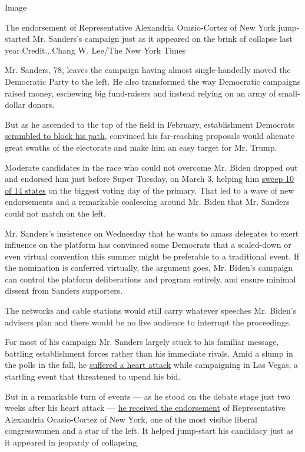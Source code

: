 Image

The endorsement of Representative Alexandria Ocasio-Cortez of New York
jump-started Mr. Sanders's campaign just as it appeared on the brink of
collapse last year.Credit...Chang W. Lee/The New York Times

Mr. Sanders, 78, leaves the campaign having almost single-handedly moved
the Democratic Party to the left. He also transformed the way Democratic
campaigns raised money, eschewing big fund-raisers and instead relying
on an army of small-dollar donors.

But as he ascended to the top of the field in February, establishment
Democrats
\href{https://www.nytimes.com/2020/03/02/us/politics/bernie-sanders-democratic-party.html?searchResultPosition=1}{scrambled
to block his path}, convinced his far-reaching proposals would alienate
great swaths of the electorate and make him an easy target for Mr.
Trump.

Moderate candidates in the race who could not overcome Mr. Biden dropped
out and endorsed him just before Super Tuesday, on March 3, helping him
\href{https://www.nytimes.com/2020/03/03/us/politics/super-tuesday-primary-winners.html}{sweep
10 of 14 states} on the biggest voting day of the primary. That led to a
wave of new endorsements and a remarkable coalescing around Mr. Biden
that Mr. Sanders could not match on the left.

Mr. Sanders's insistence on Wednesday that he wants to amass delegates
to exert influence on the platform has convinced some Democrats that a
scaled-down or even virtual convention this summer might be preferable
to a traditional event. If the nomination is conferred virtually, the
argument goes, Mr. Biden's campaign can control the platform
deliberations and program entirely, and ensure minimal dissent from
Sanders supporters.

The networks and cable stations would still carry whatever speeches Mr.
Biden's advisers plan and there would be no live audience to interrupt
the proceedings.

For most of his campaign Mr. Sanders largely stuck to his familiar
message, battling establishment forces rather than his immediate rivals.
Amid a slump in the polls in the fall, he
\href{https://www.nytimes.com/2019/10/04/us/politics/bernie-sanders-hospital.html}{suffered
a heart attack} while campaigning in Las Vegas, a startling event that
threatened to upend his bid.

But in a remarkable turn of events --- as he stood on the debate stage
just two weeks after his heart attack ---
\href{https://www.nytimes.com/2019/10/19/us/politics/bernie-sanders-aoc-queensbridge-park.html}{he
received the endorsement} of Representative Alexandria Ocasio-Cortez of
New York, one of the most visible liberal congresswomen and a star of
the left. It helped jump-start his candidacy just as it appeared in
jeopardy of collapsing.

